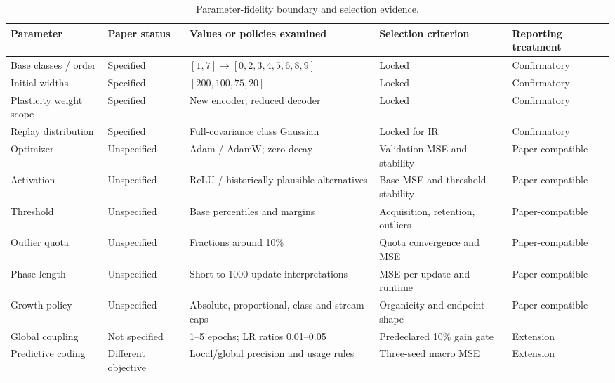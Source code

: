 \begin{table}[htbp]
\centering
\caption{Parameter-fidelity boundary and selection evidence.}
\label{tab:parameter-boundary}
\scriptsize
\begin{tabularx}{\textwidth}{p{2.5cm}p{2.4cm}p{3.3cm}p{2.8cm}Y}
\toprule
Parameter & Paper status & Values or policies examined & Selection criterion & Reporting treatment \\
\midrule
Base classes / order & Specified & $[1,7]\rightarrow[0,2,3,4,5,6,8,9]$ & Locked & Confirmatory \\
Initial widths & Specified & $[200,100,75,20]$ & Locked & Confirmatory \\
Plasticity weight scope & Specified & New encoder; reduced decoder & Locked & Confirmatory \\
Replay distribution & Specified & Full-covariance class Gaussian & Locked for IR & Confirmatory \\
Optimizer & Unspecified & Adam / AdamW; zero decay & Validation MSE and stability & Paper-compatible \\
Activation & Unspecified & ReLU / historically plausible alternatives & Base MSE and threshold stability & Paper-compatible \\
Threshold & Unspecified & Base percentiles and margins & Acquisition, retention, outliers & Paper-compatible \\
Outlier quota & Unspecified & Fractions around 10\% & Quota convergence and MSE & Paper-compatible \\
Phase length & Unspecified & Short to 1000 update interpretations & MSE per update and runtime & Paper-compatible \\
Growth policy & Unspecified & Absolute, proportional, class and stream caps & Organicity and endpoint shape & Paper-compatible \\
Global coupling & Not specified & 1--5 epochs; LR ratios 0.01--0.05 & Predeclared 10\% gain gate & Extension \\
Predictive coding & Different objective & Local/global precision and usage rules & Three-seed macro MSE & Extension \\
\bottomrule
\end{tabularx}
\end{table}

